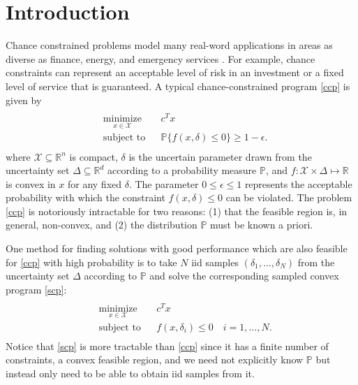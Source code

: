 \documentclass[12pt]{article}
\begin{document}
\section*{Introduction}
Chance constrained problems model many real-word applications in areas as diverse as finance, energy, and emergency services \cite{bental09}.
For example, chance constraints can represent an acceptable level of risk in an investment or a fixed level of service that is guaranteed.
A typical chance-constrained program \ref{ccp} is given by
\begin{align}\label{ccp}
\begin{split}
\begin{aligned}
    & \underset{x \in \mathcal{X}}{\text{minimize}}
    & & c^T x \\
    & \text{subject to}
    & & \mathbb{P}\{f(x,\delta) \leq 0\} \geq 1-\epsilon.
\end{aligned}
\end{split} \tag{CCP$_\epsilon$}
\end{align}
where $\mathcal{X} \subseteq \mathbb{R}^n$ is compact, $\delta$ is the uncertain parameter drawn from the uncertainty set $\Delta \subseteq \mathbb{R}^d$ according to a probability measure $\mathbb{P}$, and $f:\mathcal{X} \times \Delta \mapsto \mathbb{R}$ is convex in $x$ for any fixed $\delta$.
The parameter $0 \leq \epsilon \leq 1$ represents the acceptable probability with which the constraint $f(x,\delta) \leq 0$ can be violated.
The problem \ref{ccp} is notoriously intractable for two reasons: (1) that the feasible region is, in general, non-convex, and (2) the distribution $\mathbb{P}$ must be known a priori.

One method for finding solutions with good performance which are also feasible for \ref{ccp} with high probability is to take $N$ iid samples $(\delta_1, \ldots, \delta_N)$ from the uncertainty set $\Delta$ according to $\mathbb{P}$ and solve the corresponding sampled convex program \ref{scp}:
\begin{align}\label{scp}
\begin{split}
\begin{aligned}
    & \underset{x \in \mathcal{X}}{\text{minimize}}
    & & c^T x \\
    & \text{subject to}
    & & f(x,\delta_i) \leq 0 \quad i = 1, \ldots, N.
\end{aligned}
\end{split} \tag{SCP$_N$}
\end{align}
Notice that \ref{scp} is more tractable than \ref{ccp} since it has a finite number of constraints, a convex feasible region, and we need not explicitly know $\mathbb{P}$ but instead only need to be able to obtain iid samples from it.
\end{document}
